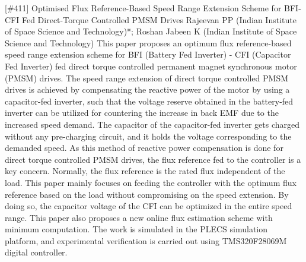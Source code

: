 {} \begin{abstract_online} {[\#411] Optimised Flux Reference-Based Speed Range Extension Scheme for BFI-CFI Fed Direct-Torque Controlled PMSM Drives} {} {Rajeevan PP (Indian Institute of Space Science and Technology)*; Roshan Jabeen K (Indian Institute of Space Science and Technology)} {} This paper proposes an optimum flux reference-based speed range extension scheme for BFI (Battery Fed Inverter) - CFI (Capacitor Fed Inverter) fed direct torque controlled permanent magnet synchronous motor (PMSM) drives. The speed range extension of direct torque controlled PMSM drives is achieved by compensating the reactive power of the motor by using a capacitor-fed inverter, such that the voltage reserve obtained in the battery-fed inverter can be utilized for countering the increase in back EMF due to the increased speed demand. The capacitor of the capacitor-fed inverter gets charged without any pre-charging circuit, and it holds the voltage corresponding to the demanded speed. As this method of reactive power compensation is done for direct torque controlled PMSM drives, the flux reference fed to the controller is a key concern. Normally, the flux reference is the rated flux independent of the load. This paper mainly focuses on feeding the controller with the optimum flux reference based on the load without compromising on the speed extension. By doing so, the capacitor voltage of the CFI can be optimized in the entire speed range. This paper also proposes a new online flux estimation scheme with minimum computation. The work is simulated in the PLECS simulation platform, and experimental verification is carried out using TMS320F28069M digital controller. \end{abstract_online} 

